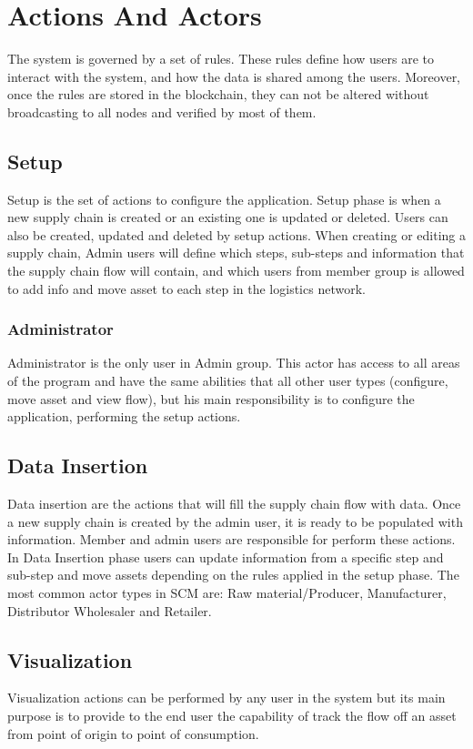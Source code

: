 \section{Actions And Actors}\label{sec:actionsAndActors}

The system is governed by a set of rules. These rules define how users are to interact with the system, and how the data is shared among the users. Moreover, once the rules are stored in the blockchain, they can not be altered without broadcasting to all nodes and verified by most of them.

\subsection{Setup}\label{sec:Setup}
Setup is the set of actions to configure the application. Setup phase is when a new supply chain is created or an existing one is updated or deleted. Users can also be created, updated and deleted by setup actions. When creating or editing a supply chain, Admin users will define which steps, sub-steps and information that the supply chain flow will contain, and which users from member group is allowed to add info and move asset to each step in the logistics network.

\subsubsection{Administrator}\label{sec:Administrator}
Administrator is the only user in Admin group. This actor has access to all areas of the program and have the same abilities that all other user types (configure, move asset and view flow), but his main responsibility is to configure the application, performing the setup actions. 



\subsection{Data Insertion}\label{sec:DataInsertion}

Data insertion are the actions that will fill the supply chain flow with data. Once a new supply chain is created by the admin user, it is ready to be populated with information. Member and admin users are responsible for perform these actions. In Data Insertion phase users can update information from a specific step and sub-step and move assets depending on the rules applied in the setup phase. The most common actor types in SCM are: Raw material/Producer, Manufacturer, Distributor Wholesaler and Retailer.


\subsection{Visualization}\label{sec:Visualization}

Visualization actions can be performed by any user in the system but its main purpose is to provide to the end user the capability of track the flow off an asset from point of origin to point of consumption.